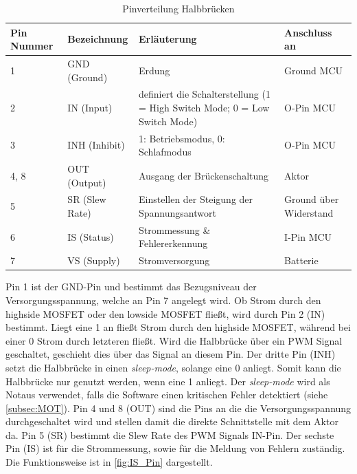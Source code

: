 \begin{table}[H]
	\centering
		\begin{tabular}{l|p{}|p{8cm}|p{3cm}}
			\textbf{Pin Nummer} & \textbf{Bezeichnung} & \textbf{Erläuterung} & \textbf{Anschluss an} \\ \hline
			1 & GND (Ground) & Erdung & Ground MCU \\
			2 & IN (Input) & definiert die Schalterstellung (1 = High Switch Mode; 0 = Low Switch Mode) & O-Pin MCU \\
			3 & INH (Inhibit) & 1: Betriebsmodus, 0: Schlafmodus & O-Pin MCU \\
			4, 8 & OUT (Output) & Ausgang der Brückenschaltung & Aktor \\
			5 & SR (Slew Rate) & Einstellen der Steigung der Spannungsantwort & Ground über Widerstand \\
			6 & IS (Status) & Strommessung \& Fehlererkennung & I-Pin MCU\\
			7 & VS (Supply) & Stromversorgung & Batterie\\
		\end{tabular}
	\caption{Pinverteilung Halbbrücken}
	\label{tab:Pinverteilung}
\end{table}\noindent
Pin 1 ist der GND-Pin und bestimmt das Bezugsniveau der Versorgungsspannung, welche an Pin 7 angelegt wird. Ob Strom durch den highside MOSFET oder den lowside MOSFET fließt, wird durch Pin 2 (IN) bestimmt. Liegt eine 1 an fließt Strom durch den highside MOSFET, während bei einer 0 Strom durch letzteren fließt. Wird die Halbbrücke über ein PWM Signal geschaltet, geschieht dies über das Signal an diesem Pin. Der dritte Pin (INH) setzt die Halbbrücke in einen \textit{sleep-mode}, solange eine 0 anliegt. Somit kann die Halbbrücke nur genutzt werden, wenn eine 1 anliegt. Der \textit{sleep-mode} wird als Notaus verwendet, falls die Software einen kritischen Fehler detektiert (siehe \autoref{subsec:MOT}). Pin 4 und 8 (OUT) sind die Pins an die die Versorgungsspannung durchgeschaltet wird und stellen damit die direkte Schnittstelle mit dem Aktor da. Pin 5 (SR) bestimmt die Slew Rate des PWM Signals IN-Pin. Der sechste Pin (IS) ist für die Strommessung, sowie für die Meldung von Fehlern zuständig. Die Funktionsweise ist in \autoref{fig:IS_Pin} dargestellt.\\

